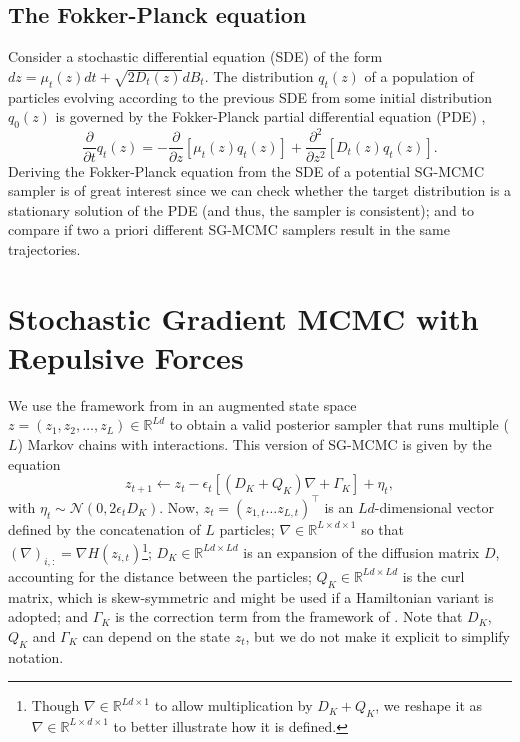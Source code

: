 \subsection{The Fokker-Planck equation}\label{sec:fp}
Consider a stochastic differential equation (SDE) of the form $d{z} = \mu_t({z})dt + \sqrt{2 D_t({z})}dB_t$. The distribution $q_t({z})$ of a population of particles evolving according to the previous SDE from some initial distribution $q_0({z})$ is governed by the Fokker-Planck partial differential equation (PDE) \parencite{risken-fpe-1989},
$$
\frac{\partial}{\partial t} q_t({z}) = -\frac{\partial}{\partial {z}} \left[ \mu_t({z}) q_t({z})\right] + \frac{\partial^2}{\partial {z}^2} \left[ D_t({z})q_t({z})\right].
$$
Deriving the Fokker-Planck equation from the SDE of a potential SG-MCMC sampler is of great interest since we can check whether the target distribution is a stationary solution of the PDE (and thus, the sampler is consistent); and to compare if two a priori different SG-MCMC samplers result in the same trajectories.






\section{Stochastic Gradient MCMC with Repulsive Forces}\label{sec:framework}

We use the framework from \cite{ma2015complete} in an augmented state space ${z} = \left( {z}_{1}, {z}_{2}, \ldots,{z}_{L}\right) \in \mathbb{R}^{Ld}$ to obtain a valid posterior sampler that runs multiple ($L$) Markov chains with interactions. This version of SG-MCMC is given by the equation
\begin{equation}\label{eq:general}
{z}_{t+1} \leftarrow {z}_t -\epsilon_t \left[ ({{D_K}} + {Q_K}){\nabla} + {\Gamma_K} \right] + {\eta}_t,
\end{equation}
with ${\eta}_t \sim \mathcal{N}({0}, 2\epsilon_t {{D_K}})$.
Now, ${z}_t = \left({z}_{1,t} \ldots  {z}_{L,t} \right)^\top$ is an $Ld$-dimensional vector defined by the concatenation of $L$ particles; ${\nabla} \in \mathbb{R}^{L \times d \times 1}$ so that $({\nabla})_{i,:} = \nabla H({z}_{i,t})$\footnote{Though ${\nabla} \in \mathbb{R}^{L d \times 1}$ to allow multiplication by ${D_K} + {Q_K}$, we reshape it as ${\nabla} \in \mathbb{R}^{L\times d \times 1}$ to better illustrate how it is defined.}; ${D_K} \in \mathbb{R}^{Ld\times Ld}$ is an expansion of the diffusion matrix $D$, accounting for the distance between the particles; ${Q_K} \in \mathbb{R}^{Ld\times Ld}$ is the curl matrix, which is skew-symmetric and might be used if a Hamiltonian variant is adopted; and ${\Gamma_K}$ is the correction term from the framework of \cite{ma2015complete}. Note that ${D_K}$, ${Q_K}$ and ${\Gamma_K}$ can depend on the state ${z}_t$, but we do not make it explicit to simplify notation.

